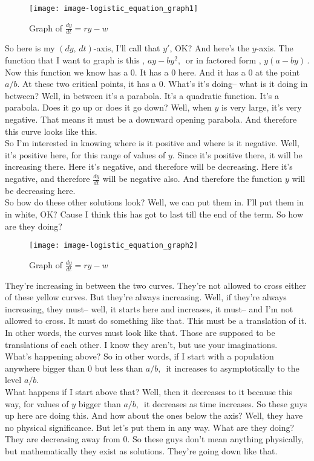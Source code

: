 \begin{wrapfigure}{r}{5.5cm}
  \texttt{[image: image-logistic\_equation\_graph1]}
  \caption{Graph of $\frac{dy}{dt} = ry - w$}
\end{wrapfigure}

So here is my $(dy,\, dt)$-axis, I'll call that $y'$, OK?
And here's the $y$-axis. 
The function that I want to graph is this $,\, ay - by^2, \,$ or in factored form
$,\, y(a - by)\,$. 
Now this function we know has a $0$.
It has a $0$ here.
And it has a $0$ at the point $a/b$.
At these two critical points, it has a $0$.
What's it's doing-- what is it doing in between?
Well, in between it's a parabola.
It's a quadratic function.
It's a parabola.
Does it go up or does it go down?
Well, when $y$ is very large, it's very negative.
That means it must be a downward opening parabola.
And therefore this curve looks like this.\\
So I'm interested in knowing where is it positive
and where is it negative.
Well, it's positive here, for this range of values of $y$.
Since it's positive there, it will be increasing there.
Here it's negative, and therefore will be decreasing.
Here it's negative, and therefore $\frac{dy}{dt}$ will be negative also.
And therefore the function $y$ will be decreasing here.\\

So how do these other solutions look?
Well, we can put them in.
I'll put them in in white, OK?
Cause I think this has got to last till the end of the term.
So how are they doing?

\begin{wrapfigure}{r}{5.5cm}
  \texttt{[image: image-logistic\_equation\_graph2]}
  \caption{Graph of $\frac{dy}{dt} = ry - w$}
\end{wrapfigure}

They're increasing in between the two curves.
They're not allowed to cross either of these yellow curves.
But they're always increasing.
Well, if they're always increasing, they must-- well,
it starts here and increases, it must--
and I'm not allowed to cross.
It must do something like that.
This must be a translation of it.
In other words, the curves must look like that.
Those are supposed to be translations of each other.
I know they aren't, but use your imaginations.\\
What's happening above?
So in other words, if I start with a population anywhere
bigger than $0$ but less than $a/b, \,$ it increases to asymptotically to the level $a/b$. \\
What happens if I start above that?
Well, then it decreases to it because this way,
for values of $y$ bigger than $a/b,\,$ it decreases as time increases.
So these guys up here are doing this.
And how about the ones below the axis?
Well, they have no physical significance.
But let's put them in any way.
What are they doing?
They are decreasing away from $0$.
So these guys don't mean anything physically,
but mathematically they exist as solutions.
They're going down like that.

